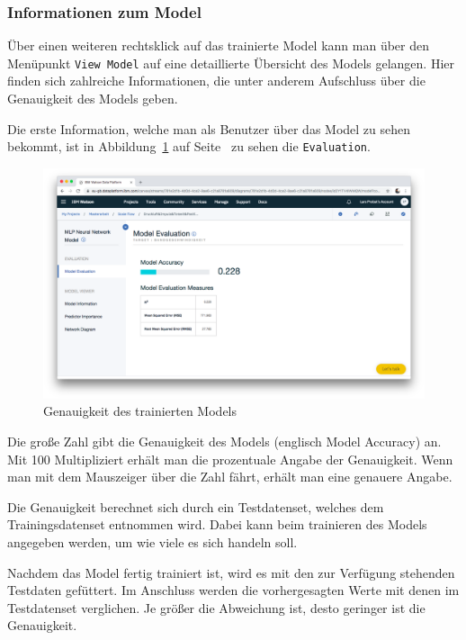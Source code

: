 \subsubsection{Informationen zum Model}
Über einen weiteren rechtsklick auf das trainierte Model kann man über den Menüpunkt \texttt{View Model} auf eine
detaillierte Übersicht des Models gelangen. Hier finden sich zahlreiche Informationen, die unter anderem Aufschluss
über die Genauigkeit des Models geben.

Die erste Information, welche man als Benutzer über das Model zu sehen bekommt, ist in
Abbildung~\ref{fig:umsetzung_model_evaluation} auf Seite~\pageref{fig:umsetzung_model_evaluation} zu sehen \textendash{}
die \texttt{Evaluation}.

\begin{figure}[h]
    \centering
    \includegraphics[width=\textwidth]{images/kapitel_3/model_evaluation.png}
    \caption{Genauigkeit des trainierten Models}
    \label{fig:umsetzung_model_evaluation}
\end{figure}

Die große Zahl gibt die Genauigkeit des Models (englisch Model Accuracy) an. Mit 100 Multipliziert erhält man die
prozentuale Angabe der Genauigkeit. Wenn man mit dem Mauszeiger über die Zahl fährt, erhält man eine genauere Angabe.

Die Genauigkeit berechnet sich durch ein Testdatenset, welches dem Trainingsdatenset entnommen wird. Dabei kann beim
trainieren des Models angegeben werden, um wie viele es sich handeln soll.

Nachdem das Model fertig trainiert ist, wird es mit den zur Verfügung stehenden Testdaten gefüttert. Im Anschluss werden
die vorhergesagten Werte mit denen im Testdatenset verglichen. Je größer die Abweichung ist, desto geringer ist die
Genauigkeit.

